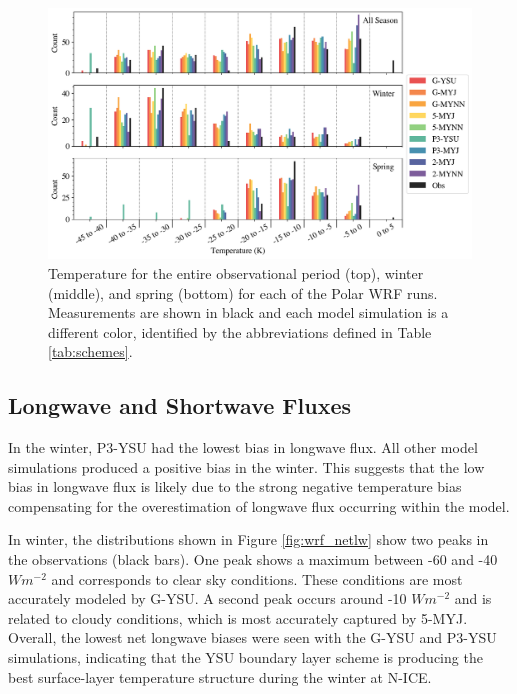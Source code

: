 \begin{figure}[h!]
    \centering
    \includegraphics[width=1\linewidth]{figures/chapter3/WRF_TSK_Histo.png}
    \caption[Polar WRF simulated temperature histograms.]{Temperature for the entire observational period (top), winter (middle), and spring (bottom) for each of the Polar WRF runs. Measurements are shown in black and each model simulation is a different color, identified by the abbreviations defined in Table \ref{tab:schemes}.}
    \label{fig:wrf_tsk}
\end{figure}

\subsection{Longwave and Shortwave Fluxes}
In the winter, P3-YSU had the lowest bias in longwave flux. All other model simulations produced a positive bias in the winter. This suggests that the low bias in longwave flux is likely due to the strong negative temperature bias compensating for the overestimation of longwave flux occurring within the model. 
 
 In winter, the distributions shown in Figure \ref{fig:wrf_netlw} show two peaks in the observations (black bars). One peak shows a maximum between -60 and -40 $Wm^{-2}$ and corresponds to clear sky conditions. These conditions are most accurately modeled by G-YSU. A second peak occurs around -10 $Wm^{-2}$ and is related to cloudy conditions, which is most accurately captured by 5-MYJ. Overall, the lowest net longwave biases were seen with the G-YSU and P3-YSU simulations, indicating that the YSU boundary layer scheme is producing the best surface-layer temperature structure during the winter at N-ICE. 
 
